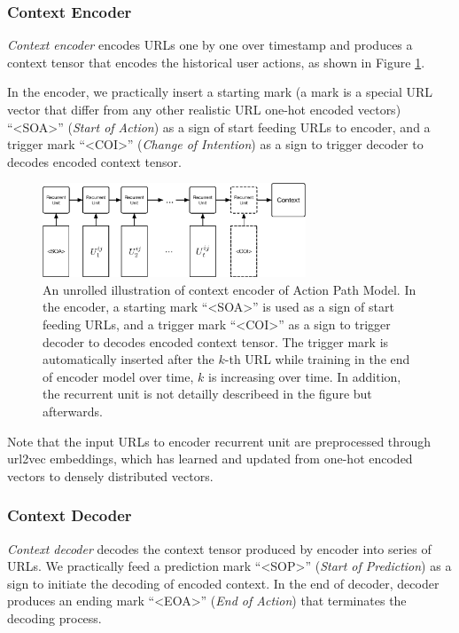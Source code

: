 \subsubsection{Context Encoder}

\emph{Context encoder} encodes URLs one by one over timestamp and produces a context tensor 
that encodes the historical user actions, as shown in Figure \ref{fig:encoder}. 

In the encoder, we practically insert a starting mark (a mark is a special URL vector that 
differ from any other realistic URL one-hot encoded vectors) ``<SOA>'' (\emph{Start of Action})
as a sign of start feeding URLs to encoder, and a trigger mark ``<COI>'' (\emph{Change of Intention}) as
a sign to trigger decoder to decodes encoded context tensor.

\begin{figure}
    \centering
    \includegraphics[width=0.7\textwidth]{figures/encoder}
    \caption{An unrolled illustration of context encoder of Action Path Model. 
    In the encoder, 
    a starting mark ``<SOA>'' is used as a sign of start feeding URLs, 
    and a trigger mark ``<COI>'' as
    a sign to trigger decoder to decodes encoded context tensor.
    The trigger mark is automatically inserted after the $k$-th URL while training in the end
    of encoder model over time, $k$ is increasing over time.
    In addition, the recurrent unit is not detailly describeed in the figure but afterwards.}
    \label{fig:encoder}
\end{figure}

Note that the input URLs to encoder recurrent unit are preprocessed through 
url2vec embeddings, which has learned and updated from one-hot encoded vectors to 
densely distributed vectors.

\subsubsection{Context Decoder}

\emph{Context decoder} decodes the context tensor produced by encoder into series of URLs. 
We practically feed a prediction mark ``<SOP>'' (\emph{Start of Prediction}) as a sign 
to initiate the decoding of encoded context. 
In the end of decoder, decoder produces an ending mark ``<EOA>'' (\emph{End of Action}) 
that terminates the decoding process.

